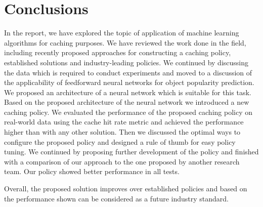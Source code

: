 \section{Conclusions}

In the report, we have explored the topic of application of machine learning algorithms for caching purposes. We have reviewed the work done in the field, including recently proposed approaches for constructing a caching policy, established solutions and industry-leading policies. We continued by discussing the data which is required to conduct experiments and moved to a discussion of the applicability of feedforward neural networks for object popularity prediction. We proposed an architecture of a neural network which is suitable for this task. Based on the proposed architecture of the neural network we introduced a new caching policy. We evaluated the performance of the proposed caching policy on real-world data using the cache hit rate metric and achieved the performance higher than with any other solution.  Then we discussed the optimal ways to configure the proposed policy and designed a rule of thumb for easy policy tuning. We continued by proposing further development of the policy and finished with a comparison of our approach to the one proposed by another research team.  Our policy showed better performance in all tests.

Overall, the proposed solution improves over established policies and based on the performance shown can be considered as a future industry standard.